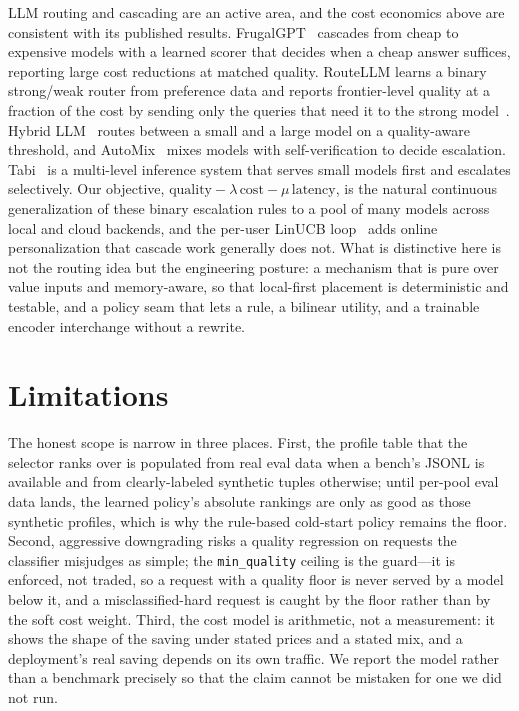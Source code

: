 \documentclass[11pt]{article}
\begin{document}
LLM routing and cascading are an active area, and the cost economics above are
consistent with its published results. FrugalGPT~\cite{frugalgpt} cascades from
cheap to expensive models with a learned scorer that decides when a cheap
answer suffices, reporting large cost reductions at matched quality. RouteLLM
learns a binary strong/weak router from preference data and reports frontier-level
quality at a fraction of the cost by sending only the queries that need it to the
strong model~\cite{routellm}. Hybrid LLM~\cite{hybridllm} routes between a small
and a large model on a quality-aware threshold, and AutoMix~\cite{automix} mixes
models with self-verification to decide escalation. Tabi~\cite{tabi} is a
multi-level inference system that serves small models first and escalates
selectively. Our objective, $\mathrm{quality}-\lambda\,\mathrm{cost}-\mu\,\mathrm{latency}$,
is the natural continuous generalization of these binary escalation rules to a
pool of many models across local and cloud backends, and the per-user LinUCB
loop~\cite{linucb} adds online personalization that cascade work generally does
not. What is distinctive here is not the routing idea but the engineering
posture: a mechanism that is pure over value inputs and memory-aware, so that
local-first placement is deterministic and testable, and a policy seam that
lets a rule, a bilinear utility, and a trainable encoder interchange without a
rewrite.

\section{Limitations}
\label{sec:limits}

The honest scope is narrow in three places. First, the profile table that the
selector ranks over is populated from real eval data when a bench's JSONL is
available and from clearly-labeled synthetic tuples otherwise; until per-pool
eval data lands, the learned policy's absolute rankings are only as good as
those synthetic profiles, which is why the rule-based cold-start policy remains
the floor. Second, aggressive downgrading risks a quality regression on requests
the classifier misjudges as simple; the \texttt{min\_quality} ceiling is the
guard---it is enforced, not traded, so a request with a quality floor is never
served by a model below it, and a misclassified-hard request is caught by the
floor rather than by the soft cost weight. Third, the cost model is arithmetic,
not a measurement: it shows the shape of the saving under stated prices and a
stated mix, and a deployment's real saving depends on its own traffic. We report
the model rather than a benchmark precisely so that the claim cannot be mistaken
for one we did not run.
\end{document}
